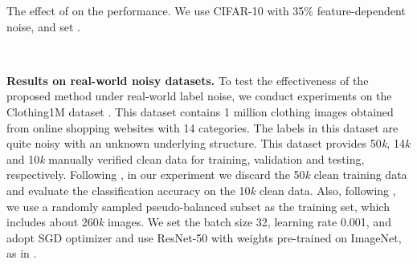 \documentclass{article} \usepackage{iclr2021_conference,times}
\begin{document}
\begin{table}[!htb]
\vspace{-1.5em}
    \centering
    \begin{minipage}{.48\linewidth}
        \caption{The effect of  on the performance. We use CIFAR-10 with 35\% feature-dependent noise, and set .}
        \label{tab:delta}
    \end{minipage}~~~~
    \begin{minipage}{.48\linewidth}
        \caption{The effect of  on the performance. We use CIFAR-10 with 35\% feature-dependent noise, and set .}
        \label{tab:beta}
    \end{minipage}
\end{table}


\textbf{Results on real-world noisy datasets.} To test the effectiveness of the proposed method under real-world label noise, we conduct experiments on the Clothing1M dataset \citep{cloth1m}. This dataset contains 1 million clothing images obtained from online shopping websites with 14 categories. The labels in this dataset are quite noisy with an unknown underlying structure. This dataset provides 50\textit{k}, 14\textit{k} and 10\textit{k} manually verified clean data for training, validation and testing, respectively. Following \citep{tanaka2018joint,pencil_cvpr2019}, in our experiment we discard the 50\textit{k} clean training data and evaluate the classification accuracy on the 10\textit{k} clean data. Also, following \citep{pencil_cvpr2019}, we use a randomly sampled pseudo-balanced subset as the training set, which includes about 260\textit{k} images. We set the batch size 32, learning rate 0.001, and adopt SGD optimizer and use ResNet-50 with weights pre-trained on ImageNet, as in \citep{tanaka2018joint,pencil_cvpr2019}.
\end{document}

